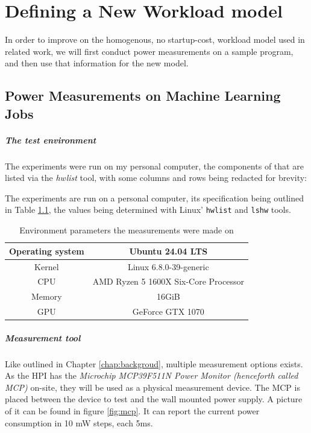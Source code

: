 \chapter{Defining a New Workload model}

In order to improve on the homogenous, no startup-cost, workload model used in related work, we will first conduct power measurements on a sample program, and then use that information for the new model.

\section{Power Measurements on Machine Learning Jobs}
\label{sec:power_measurements}

\paragraph{The test environment}

The experiments were run on my personal computer, the components of that are listed via the \emph{hwlist} tool, with some columns and rows being redacted for brevity:

The experiments are run on a personal computer, its specification being outlined in Table \ref{tab:measurement_environment}, the values being determined with Linux' \verb|hwlist| and \verb|lshw| tools.

\begin{table}[h!]
    \centering
    \begin{tabular}{|c|c|}
    \hline
        Operating system & Ubuntu 24.04 LTS \\ \hline
        Kernel & Linux 6.8.0-39-generic \\ \hline
        CPU & AMD Ryzen 5 1600X Six-Core Processor \\ \hline
        Memory & 16GiB \\ \hline
        GPU & GeForce GTX 1070 \\ \hline
    \end{tabular}
    \caption{Environment parameters the measurements were made on}
\label{tab:measurement_environment}
\end{table}

\paragraph{Measurement tool}

Like outlined in Chapter \ref{chap:backgroud}, multiple measurement options exists. 
As the HPI has the \emph{Microchip MCP39F511N Power Monitor (henceforth called MCP)} on-site, they will be used as a physical measurement device.
The MCP is placed between the device to test and the wall mounted power supply. A picture of it can be found in figure \ref{fig:mcp}. It can report the current power consumption in 10 mW steps, each 5ms.

